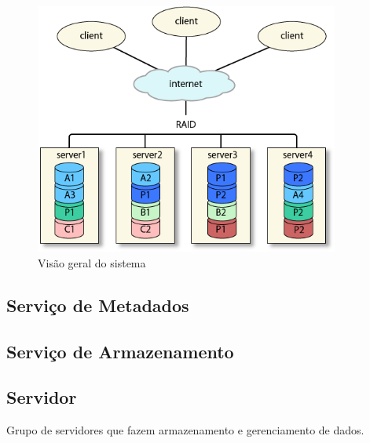 	\begin{figure}[htb]
		\begin{center}
			
			\includegraphics[clip,width=10.0cm]{images/image1.png}
			\caption{Visão geral do sistema}
			\label{fig:vis_sis}
		\end{center}
	\end{figure}
	
	\subsection{Serviço de Metadados}
	
	\subsection{Serviço de Armazenamento}
	
	\subsection{Servidor}
	
	Grupo de servidores que fazem armazenamento e gerenciamento de dados. \\
	
